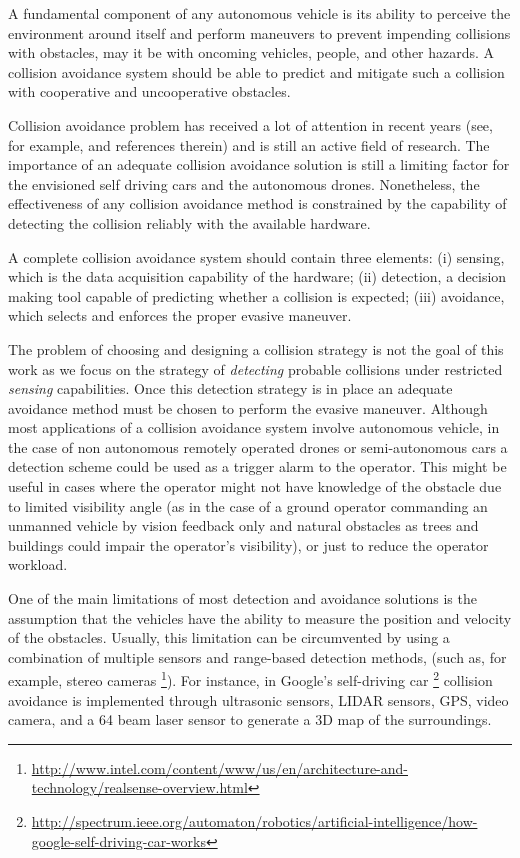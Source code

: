 \documentclass[]{aiaa-tc}%
\begin{document}
A fundamental component of any autonomous vehicle is its ability to perceive the environment around itself and perform maneuvers to prevent impending collisions with obstacles, may it be with  oncoming vehicles, people, and other hazards. A collision avoidance system should be able to predict and mitigate such a collision with cooperative and uncooperative obstacles.

Collision avoidance problem has received a lot of attention in recent years (see, for example, \cite{khatib96,chakravarthy98,carbone08,smith08,sti10,shankaran2011collision,rodriguez2011collision,mikaCA, gusrialdi2008coverage,laventall2008coverage} and references therein) and is still an active field of research. The importance of an adequate collision avoidance solution is still a limiting factor for the envisioned self driving cars and the autonomous drones.  Nonetheless, the effectiveness of any collision avoidance method is constrained by the capability of detecting the collision reliably with the available hardware.

A complete collision avoidance system should contain three elements: (i) sensing, which is the data acquisition capability of the hardware; (ii) detection, a decision making tool capable of predicting whether a collision is expected; (iii) avoidance, which selects and enforces the proper evasive maneuver.

The problem of choosing and designing a collision strategy is not the goal of this work as we focus on the strategy of {\em detecting} probable collisions under restricted {\em sensing} capabilities. Once this detection strategy is in place an adequate avoidance method must be chosen to perform the evasive maneuver. Although most applications of a collision avoidance system involve autonomous vehicle, in the case of non autonomous remotely operated drones or semi-autonomous cars a detection scheme could be used as a trigger alarm to the operator. This might be useful in cases where the operator might not have knowledge of the obstacle due to limited visibility angle (as in the case of a ground operator commanding an unmanned vehicle by vision feedback only and natural obstacles as trees and buildings could impair the operator’s visibility), or just to reduce the operator workload.

One of the main limitations of most detection and avoidance solutions is the assumption that the vehicles have the ability to measure the position and velocity of the obstacles. Usually, this limitation can be circumvented by using a combination of multiple sensors and range-based detection methods, (such as, for example, stereo cameras \cite{BarryT14} \footnote{\url{http://www.intel.com/content/www/us/en/architecture-and-technology/realsense-overview.html}}). For instance, in Google's self-driving car \cite{rathod2013autonomous} \footnote{\url{http://spectrum.ieee.org/automaton/robotics/artificial-intelligence/how-google-self-driving-car-works}} collision avoidance is implemented through ultrasonic sensors, LIDAR sensors, GPS, video camera, and a 64 beam laser sensor to generate a 3D map of the surroundings.
\end{document}
